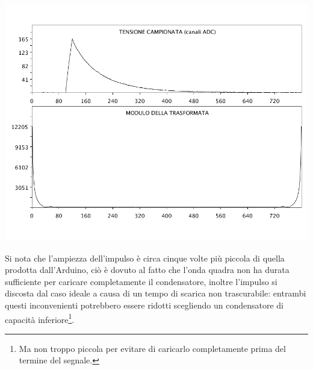 \documentclass[10pt,oneside,a4paper]{article}
\newenvironment{Figure}
  {\par\medskip\noindent\minipage{\linewidth}}
  {\endminipage\par\medskip}
\begin{document}
\begin{multicols}{2}
\begin{Figure}
	\begin{center}
	\includegraphics[width=\linewidth]{impulsoRC}
	\label{fig:impulsoRC}
	\end{center}
\end{Figure}

Si nota che l'ampiezza dell'impulso è circa cinque volte più piccola di quella prodotta dall'Arduino, ciò è dovuto al fatto che l'onda quadra non ha durata sufficiente per caricare completamente il condensatore, inoltre l'impulso si discosta dal caso ideale a causa di un tempo di scarica non trascurabile: entrambi questi inconvenienti potrebbero essere ridotti scegliendo un condensatore di capacità inferiore\footnote{Ma non troppo piccola per evitare di caricarlo completamente prima del termine del segnale.}.


\end{multicols}
\end{document}
